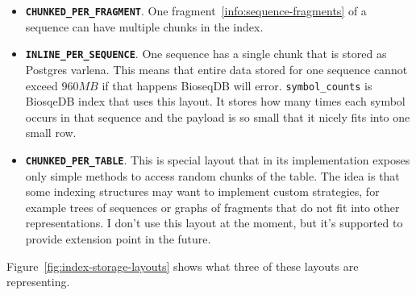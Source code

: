 \begin{itemize}
  \item \textbf{\texttt{CHUNKED\_PER\_FRAGMENT}}.
    One fragment~\ref{info:sequence-fragments} of a sequence can have multiple chunks in the index.
  \item \textbf{\texttt{INLINE\_PER\_SEQUENCE}}.
    One sequence has a single chunk that is stored as Postgres varlena. This means that entire data stored for one sequence cannot exceed $960MB$ if that happens BioseqDB will error.
    \texttt{symbol\_counts} is BiosqeDB index that uses this layout. It stores how many times each symbol occurs in that sequence and the payload is so small that it nicely fits into one small row.
  \item \textbf{\texttt{CHUNKED\_PER\_TABLE}}.
    This is special layout that in its implementation exposes only simple methods to access random chunks of the table. The idea is that some indexing structures may want 
    to implement custom strategies, for example trees of sequences or graphs of fragments that do not fit into other representations.
    I don't use this layout at the moment, but it's supported to provide extension point in the future. 
\end{itemize}

Figure~\ref{fig:index-storage-layouts} shows what three of these layouts are representing.

